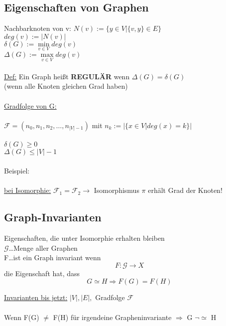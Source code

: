 \subsection{Eigenschaften von Graphen}
Nachbarknoten von v: $N(v):=\{y \in V|\{v,y\} \in E\}$\\
$deg(v):=|N(v)|$\\
$\delta(G):= \min \limits_{v \in V} deg(v)$\\
$\Delta(G):= \max \limits_{v \in V} deg(v)$\\
\\
\underline{Def:} Ein Graph heißt \textbf{REGULÄR} wenn $\Delta(G)=\delta(G)$\\(wenn alle Knoten gleichen Grad haben)
\\\\
\underline{Gradfolge von G:}\\\\
$\mathcal{F}=(n_0,n_1,n_2,…,n_{|V|-1})$ mit $n_k:=|\{x \in V|deg(x)=k\}|$\\\\
$\delta(G) \geq 0$\\
$\Delta(G) \leq |V|-1$\\\\
Beispiel:
\\\\
\underline{bei Isomorphie:} $\mathcal{F}_1=\mathcal{F}_2 \rightarrow$ Isomorphismus $\pi$ erhält Grad der Knoten!

\subsection{Graph-Invarianten}
Eigenschaften, die unter Isomorphie erhalten bleiben\\
$\mathcal{G}$…Menge aller Graphen\\
F…ist ein Graph invariant wenn\\
\begin{equation}
	F:\mathcal{G} \rightarrow X
\end{equation}
die Eigenschaft hat, dass
\begin{equation}
	G \simeq H \Rightarrow F(G) = F(H)
\end{equation}

\underline{Invarianten bis jetzt:} $|V|, |E|,$ Gradfolge $\mathcal{F}$\\\\
Wenn F(G) $\neq$ F(H) für irgendeine Grapheninvariante $\Rightarrow$ G $\neg \simeq$ H

